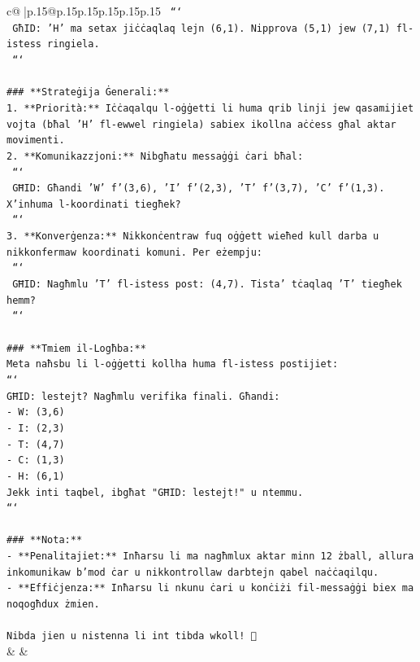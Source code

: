 \documentclass{article}
\begin{document}
{\begin{supertabular}{c@{$\;$}|p{.15\linewidth}@{}p{.15\linewidth}p{.15\linewidth}p{.15\linewidth}p{.15\linewidth}p{.15\linewidth}}
{{{\texttt{  ```} \\
\texttt{  GħID: 'H' ma setax jiċċaqlaq lejn (6,1). Nipprova (5,1) jew (7,1) fl{-}istess ringiela.} \\
\texttt{  ```} \\
\\ 
\texttt{\#\#\# **Strateġija Ġenerali:**} \\
\texttt{1. **Priorità:** Iċċaqalqu l{-}oġġetti li huma qrib linji jew qasamijiet vojta (bħal 'H' fl{-}ewwel ringiela) sabiex ikollna aċċess għal aktar movimenti.} \\
\texttt{2. **Komunikazzjoni:** Nibgħatu messaġġi ċari bħal:} \\
\texttt{   ```} \\
\texttt{   GĦID: Għandi 'W' f'(3,6), 'I' f'(2,3), 'T' f'(3,7), 'C' f'(1,3). X'inhuma l{-}koordinati tiegħek?} \\
\texttt{   ```} \\
\texttt{3. **Konverġenza:** Nikkonċentraw fuq oġġett wieħed kull darba u nikkonfermaw koordinati komuni. Per eżempju:} \\
\texttt{   ```} \\
\texttt{   GĦID: Nagħmlu 'T' fl{-}istess post: (4,7). Tista' tċaqlaq 'T' tiegħek hemm?} \\
\texttt{   ```} \\
\\ 
\texttt{\#\#\# **Tmiem il{-}Logħba:**} \\
\texttt{Meta naħsbu li l{-}oġġetti kollha huma fl{-}istess postijiet:} \\
\texttt{```} \\
\texttt{GĦID: lestejt? Nagħmlu verifika finali. Għandi:} \\
\texttt{{-} W: (3,6)} \\
\texttt{{-} I: (2,3)} \\
\texttt{{-} T: (4,7)} \\
\texttt{{-} C: (1,3)} \\
\texttt{{-} H: (6,1)} \\
\texttt{Jekk inti taqbel, ibgħat "GĦID: lestejt!" u ntemmu.} \\
\texttt{```} \\
\\ 
\texttt{\#\#\# **Nota:**} \\
\texttt{{-} **Penalitajiet:** Inħarsu li ma nagħmlux aktar minn 12 żball, allura inkomunikaw b'mod ċar u nikkontrollaw darbtejn qabel naċċaqilqu.} \\
\texttt{{-} **Effiċjenza:** Inħarsu li nkunu ċari u konċiżi fil{-}messaġġi biex ma noqogħdux żmien.} \\
\\ 
\texttt{Nibda jien u nistenna li int tibda wkoll! 🚀} \\
            }
        }
    }
    & & \\ \\


\end{supertabular}}
\end{document}

